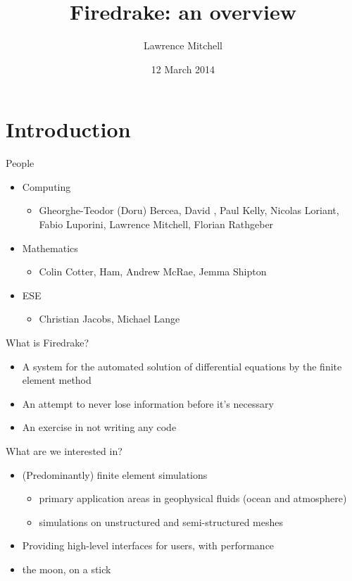 \documentclass[bigger]{beamer}
\author{Lawrence Mitchell}
\date{12 March 2014}
\title{Firedrake: an overview}
\begin{document}
\maketitle

\section{Introduction}
\label{sec:orgheadline4}

\begin{frame}[label={sec:orgheadline1}]{People}
\begin{itemize}
\item Computing
\begin{itemize}
\item Gheorghe-Teodor (Doru) Bercea, David \phantom{Ham}, Paul Kelly, Nicolas Loriant,
Fabio Luporini, Lawrence Mitchell, Florian Rathgeber
\end{itemize}
\item Mathematics
\begin{itemize}
\item Colin Cotter, \phantom{David} Ham, Andrew McRae, Jemma Shipton
\end{itemize}
\item ESE
\begin{itemize}
\item Christian Jacobs, Michael Lange
\end{itemize}
\end{itemize}
\end{frame}

\begin{frame}[label={sec:orgheadline2}]{What is Firedrake?}
\begin{itemize}
\item A system for the automated solution of differential equations by the
finite element method
\item An attempt to never lose information before it's necessary
\item An exercise in not writing any code
\end{itemize}
\end{frame}

\begin{frame}[label={sec:orgheadline3}]{What are we interested in?}
\begin{itemize}
\item (Predominantly) finite element simulations
\begin{itemize}
\item primary application areas in geophysical fluids (ocean and
atmosphere)
\item simulations on unstructured and semi-structured meshes
\end{itemize}
\item Providing high-level interfaces for users, with performance
\end{itemize}
\pause
\begin{itemize}
\item the moon, on a stick
\end{itemize}
\end{frame}
\end{document}
